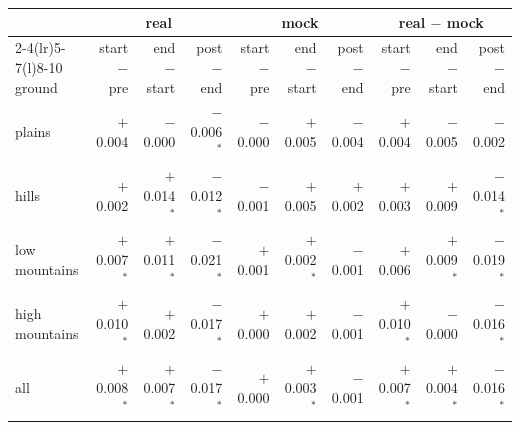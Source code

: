 \begin{tabular}{@{}l r r r r r r r r r@{}}
\toprule
 & \multicolumn{3}{c}{real} & \multicolumn{3}{c}{mock} & \multicolumn{3}{c}{real $-$ mock} \\
\cmidrule(lr){2-4}\cmidrule(lr){5-7}\cmidrule(l){8-10}
ground & start $-$ pre & end $-$ start & post $-$ end & start $-$ pre & end $-$ start & post $-$ end & start $-$ pre & end $-$ start & post $-$ end \\
\midrule
plains & $+$0.004 & $-$0.000 & $-$0.006$^\ast$ & $-$0.000 & $+$0.005 & $-$0.004 & $+$0.004 & $-$0.005 & $-$0.002 \\
hills & $+$0.002 & $+$0.014$^\ast$ & $-$0.012$^\ast$ & $-$0.001 & $+$0.005 & $+$0.002 & $+$0.003 & $+$0.009 & $-$0.014$^\ast$ \\
low mountains & $+$0.007$^\ast$ & $+$0.011$^\ast$ & $-$0.021$^\ast$ & $+$0.001 & $+$0.002$^\ast$ & $-$0.001 & $+$0.006 & $+$0.009$^\ast$ & $-$0.019$^\ast$ \\
high mountains & $+$0.010$^\ast$ & $+$0.002 & $-$0.017$^\ast$ & $+$0.000 & $+$0.002 & $-$0.001 & $+$0.010$^\ast$ & $-$0.000 & $-$0.016$^\ast$ \\
all & $+$0.008$^\ast$ & $+$0.007$^\ast$ & $-$0.017$^\ast$ & $+$0.000 & $+$0.003$^\ast$ & $-$0.001 & $+$0.007$^\ast$ & $+$0.004$^\ast$ & $-$0.016$^\ast$ \\
\bottomrule
\end{tabular}
